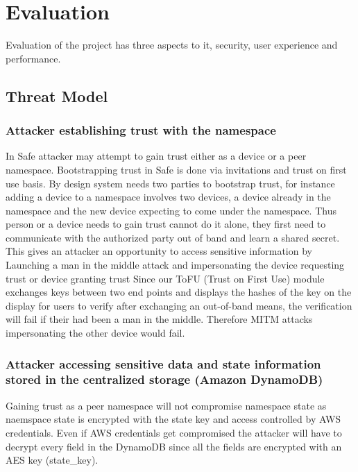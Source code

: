 \setcounter{secnumdepth}{4}

\section{Evaluation}
\label{sec:eval}

Evaluation of the project has three aspects to it, security, user experience and performance.  

\subsection{Threat Model}

\subsubsection{Attacker establishing trust with the namespace }
In Safe attacker may attempt to gain trust either as a device or a peer namespace. Bootstrapping trust in Safe is done via invitations and trust on first use basis. By design system needs two parties to bootstrap trust, for instance adding a device to a namespace involves two devices, a device already in the namespace and the new device expecting to come under the namespace. Thus person or a device needs to gain trust cannot do it alone, they first need to communicate with the authorized party out of band and learn a shared secret. This gives an attacker an opportunity to access  sensitive information by Launching a man in the middle attack and impersonating the device requesting trust or device granting trust
Since our ToFU (Trust on First Use) module exchanges keys between two end points and displays the hashes of the key on the display for users to verify after exchanging an out-of-band means, the verification will fail if their had been a man in the middle. Therefore MITM attacks impersonating the other device would fail.

\subsubsection{Attacker accessing sensitive data and state information stored in the centralized storage (Amazon DynamoDB)}
Gaining trust as a peer namespace will not compromise namespace state as naemspace state is encrypted with the state key and access controlled by AWS credentials. Even if AWS credentials get compromised the attacker will have to decrypt every field in the DynamoDB since all the fields are encrypted with an AES key (state\_key). 

